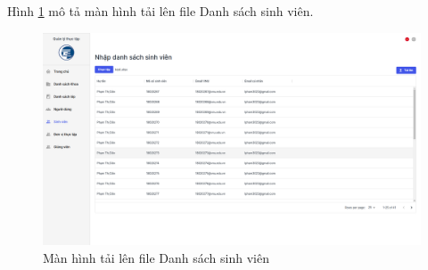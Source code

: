 \documentclass[./../main.tex]{subfiles}
\begin{document}
Hình \ref{fig:upload_list} mô tả màn hình tải lên file Danh sách sinh viên.

\begin{figure}[]
	\includegraphics[width=\linewidth]{./images/image28.png}
	\caption{Màn hình tải lên file Danh sách sinh viên}
	\label{fig:upload_list}
\end{figure}

\end{document}

